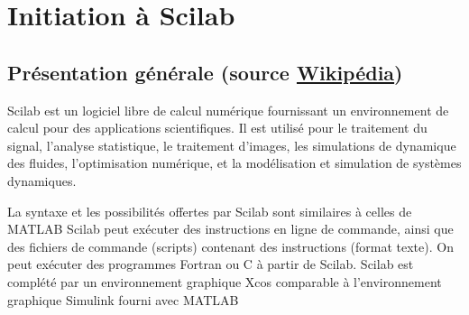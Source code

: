 \chapter{Initiation à Scilab\label{annexe-scilab}}
\section[Présentation générale]
        {Présentation générale 
        (source \href{https://fr.wikipedia.org/wiki/Scilab}{Wikipédia})}
Scilab est un logiciel libre de calcul numérique fournissant un environnement de
calcul pour des applications scientifiques. Il est utilisé pour le traitement 
du signal, l'analyse statistique, le traitement d'images, les simulations de 
dynamique des fluides, l'optimisation numérique, et la modélisation et 
simulation de systèmes dynamiques.

La syntaxe et les possibilités offertes par Scilab sont similaires à celles 
de MATLAB Scilab peut exécuter des instructions en ligne de commande, ainsi que
des fichiers de commande (scripts) contenant des instructions (format texte). 
On peut exécuter des programmes Fortran ou C à partir de Scilab.
Scilab est complété par un environnement graphique Xcos comparable 
à l'environnement graphique Simulink fourni avec MATLAB 
